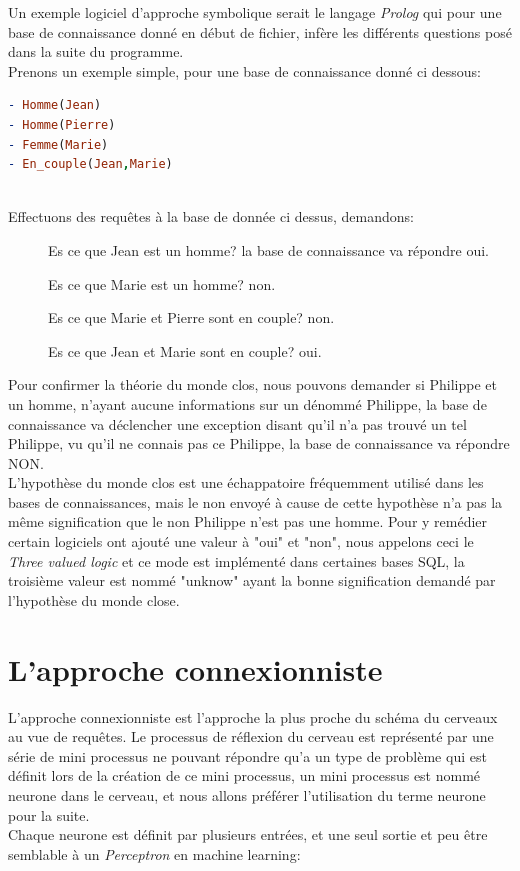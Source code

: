 Un exemple logiciel d'approche symbolique serait le langage \textit{Prolog} qui pour une base de connaissance donné en début de fichier, infère les différents questions posé dans la suite du programme.\\
Prenons un exemple simple, pour une base de connaissance donné ci dessous:
\linebreak
\lstset{style=mlpythoncode}
\begin{lstlisting}[language=Prolog]
- Homme(Jean)
- Homme(Pierre)
- Femme(Marie)
- En_couple(Jean,Marie)
\end{lstlisting}
\ \\
Effectuons des requêtes à la base de donnée ci dessus, demandons:
\begin{description}
\item[] Es ce que Jean est un homme? la base de connaissance va répondre oui.
\item[] Es ce que Marie est un homme? non.
\item[] Es ce que Marie et Pierre sont en couple? non.
\item[] Es ce que Jean et Marie sont en couple? oui.
\end{description}

Pour confirmer la théorie du monde clos, nous pouvons demander si Philippe et un homme, n'ayant aucune informations sur un dénommé Philippe, la base de connaissance va déclencher une exception disant qu'il n'a pas trouvé un tel Philippe, vu qu'il ne connais pas ce Philippe, la base de connaissance va répondre NON.\\
\linebreak
L'hypothèse du monde clos est une échappatoire fréquemment utilisé dans les bases de connaissances, mais le non envoyé à cause de cette hypothèse n'a pas la même signification que le non Philippe n'est pas une homme. Pour y remédier certain logiciels ont ajouté une valeur à "oui" et "non", nous appelons ceci le \textit{Three valued logic} et ce mode est implémenté dans certaines bases SQL, la troisième valeur est nommé "unknow" ayant la bonne signification demandé par l'hypothèse du monde close.

\pagebreak
\section{L'approche connexionniste}
L'approche connexionniste est l'approche la plus proche du schéma du cerveaux au vue de requêtes. Le processus de réflexion du cerveau est représenté par une série de mini processus ne pouvant répondre qu'a un type de problème qui est définit lors de la création de ce mini processus, un mini processus est nommé neurone dans le cerveau, et nous allons préférer l'utilisation du terme neurone pour la suite. \\
Chaque neurone est définit par plusieurs entrées, et une seul sortie et peu être semblable à un \textit{Perceptron} en machine learning:

